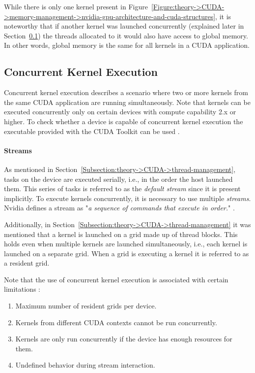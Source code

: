 While there is only one kernel present in Figure~\ref{Figure:theory->CUDA->memory-management->nvidia-gpu-architecture-and-cuda-structures}, it is noteworthy that if another kernel was launched concurrently (explained later in Section~\ref{Subsection:theory->CUDA->concurrent-kernel-execution}) the threads allocated to it would also have access to global memory.
In other words, global memory is the same for all kernels in a CUDA application.

\subsection{Concurrent Kernel Execution}\label{Subsection:theory->CUDA->concurrent-kernel-execution}
Concurrent kernel execution describes a scenario where two or more kernels from the same CUDA application are running simultaneously.
Note that kernels can be executed concurrently only on certain devices with compute capability 2.x or higher.
To check whether a device is capable of concurrent kernel execution the  executable provided with the CUDA Toolkit can be used \cite{NVIDIADecember2022}.

\paragraph{Streams} As mentioned in Section~\ref{Subsection:theory->CUDA->thread-management}, tasks on the device are executed serially, i.e., in the order the host launched them.
This series of tasks is referred to as the \textit{default stream} since it is present implicitly.
To execute kernels concurrently, it is necessary to use multiple \textit{streams}.
Nvidia defines a stream as "\textit{a sequence of commands that execute in order.}" \cite{NVIDIADecember2022}.

Additionally, in Section~\ref{Subsection:theory->CUDA->thread-management} it was mentioned that a kernel is launched on a grid made up of thread blocks.
This holds even when multiple kernels are launched simultaneously, i.e., each kernel is launched on a separate grid.
When a grid is executing a kernel it is referred to as a resident grid.

Note that the use of concurrent kernel execution is associated with certain limitations \cite{Cejka2022, NVIDIADecember2022}:

\begin{enumerate}
	\item Maximum number of resident grids per device.
	\item Kernels from different CUDA contexts cannot be run concurrently.
	\item Kernels are only run concurrently if the device has enough resources for them.
	\item Undefined behavior during stream interaction.
\end{enumerate}


